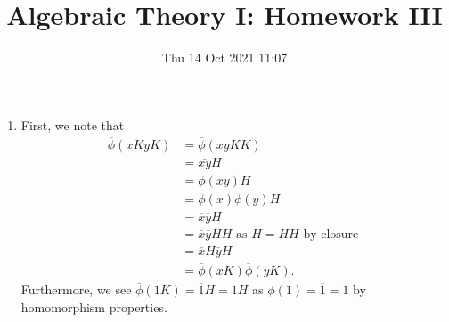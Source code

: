 \documentclass[a4paper]{article}
\title{Algebraic Theory I: Homework III}
\date{Thu 14 Oct 2021 11:07}
\begin{document}
\maketitle
\begin{solution}[1]
\begin{enumerate}
	\item First, we note that
		\begin{align*}
			\overline{\phi}\left( xK yK \right) &= \overline{\phi}\left( xyKK \right)  \\
			&=  \overline{xy} H\\
			&= \phi\left( xy \right) H\\
			&= \phi\left( x \right) \phi\left( y \right) H \\
			&= \overline{x} \overline{y} H\\
			&= \overline{x}\overline{y} H H \text{ as \(H = H H\) by closure }\\
		&= \overline{x} H \overline{y} H \\
		&= \overline{\phi}\left( xK \right) \overline{\phi}\left( yK \right)
		.\end{align*}
		Furthermore, we see \(\overline{\phi}\left( 1K \right) = \overline{1}H = 1H\) as \(\phi\left( 1 \right)  = \overline{1} = 1\)  by homomorphism properties.


\end{enumerate}
\end{solution}
\end{document}

